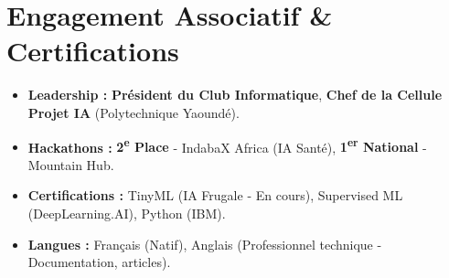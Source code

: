 \documentclass[a4paper,11pt]{article}
\begin{document}
\section{Engagement Associatif \& Certifications}
\begin{itemize}[leftmargin=*, nosep]
    \item \textbf{Leadership :} \textbf{Président du Club Informatique}, \textbf{Chef de la Cellule Projet IA} (Polytechnique Yaoundé).
    \item \textbf{Hackathons :} \textbf{2\textsuperscript{e} Place} - IndabaX Africa (IA Santé), \textbf{1\textsuperscript{er} National} - Mountain Hub.
    \item \textbf{Certifications :} TinyML (IA Frugale - En cours), Supervised ML (DeepLearning.AI), Python (IBM).
    \item \textbf{Langues :} Français (Natif), Anglais (Professionnel technique - Documentation, articles).
\end{itemize}
\end{document}
